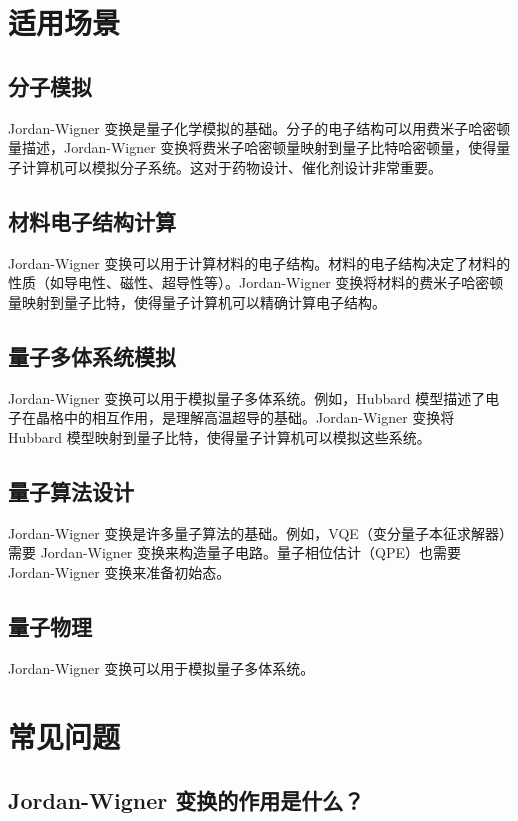 \documentclass[12pt,a4paper]{article}
\begin{document}
\section{适用场景}

\subsection{分子模拟}

Jordan-Wigner 变换是量子化学模拟的基础。分子的电子结构可以用费米子哈密顿量描述，Jordan-Wigner 变换将费米子哈密顿量映射到量子比特哈密顿量，使得量子计算机可以模拟分子系统。这对于药物设计、催化剂设计非常重要。

\subsection{材料电子结构计算}

Jordan-Wigner 变换可以用于计算材料的电子结构。材料的电子结构决定了材料的性质（如导电性、磁性、超导性等）。Jordan-Wigner 变换将材料的费米子哈密顿量映射到量子比特，使得量子计算机可以精确计算电子结构。

\subsection{量子多体系统模拟}

Jordan-Wigner 变换可以用于模拟量子多体系统。例如，Hubbard 模型描述了电子在晶格中的相互作用，是理解高温超导的基础。Jordan-Wigner 变换将 Hubbard 模型映射到量子比特，使得量子计算机可以模拟这些系统。

\subsection{量子算法设计}

Jordan-Wigner 变换是许多量子算法的基础。例如，VQE（变分量子本征求解器）需要 Jordan-Wigner 变换来构造量子电路。量子相位估计（QPE）也需要 Jordan-Wigner 变换来准备初始态。

\subsection{量子物理}

Jordan-Wigner 变换可以用于模拟量子多体系统。

\section{常见问题}

\subsection{Jordan-Wigner 变换的作用是什么？}
\end{document}
